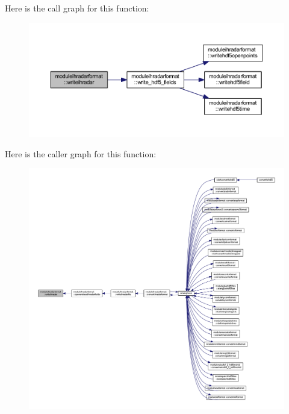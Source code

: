 Here is the call graph for this function\+:\nopagebreak
\begin{figure}[H]
\begin{center}
\leavevmode
\includegraphics[width=350pt]{namespacemoduleihradarformat_a6051373784b4b3c69f611fa904fbad43_cgraph}
\end{center}
\end{figure}
Here is the caller graph for this function\+:\nopagebreak
\begin{figure}[H]
\begin{center}
\leavevmode
\includegraphics[width=350pt]{namespacemoduleihradarformat_a6051373784b4b3c69f611fa904fbad43_icgraph}
\end{center}
\end{figure}
\mbox{\label{namespacemoduleihradarformat_a159e87b28314bc4e1c2d025679d954ff}} 

